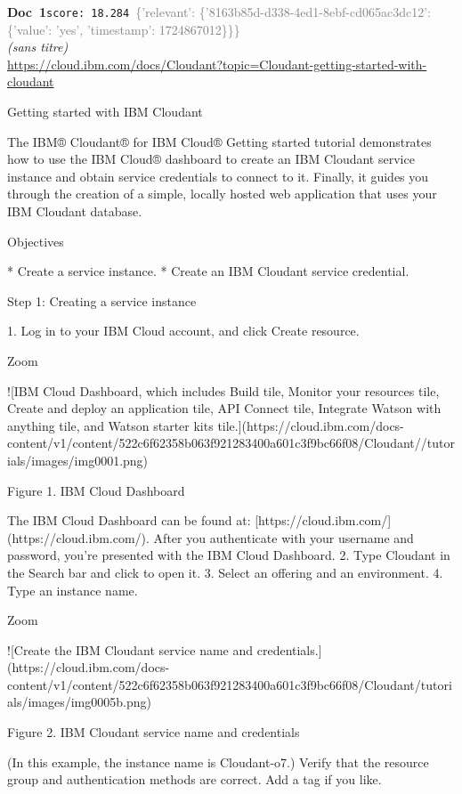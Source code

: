 \documentclass[a4paper,11pt]{article}
\begin{document}
\begin{docenv}
{\footnotesize\textcolor{doccolor}{\textbf{Doc~1}}}\hfill{\tiny\texttt{score:~18.284}}\ {\tiny\textcolor{gray}{\{'relevant': \{'8163b85d-d338-4ed1-8ebf-cd065ac3dc12': \{'value': 'yes', 'timestamp': 1724867012\}\}\}}}\\[3pt]
{\small\textit{(sans titre)}}\\[2pt]
{\tiny\url{https://cloud.ibm.com/docs/Cloudant?topic=Cloudant-getting-started-with-cloudant}}\\[4pt]
{\footnotesize 
Getting started with IBM Cloudant 

The IBM® Cloudant® for IBM Cloud® Getting started tutorial demonstrates how to use the IBM Cloud® dashboard to create an IBM Cloudant service instance and obtain service credentials to connect to it. Finally, it guides you through the creation of a simple, locally hosted web application that uses your IBM Cloudant database.



 Objectives 



* Create a service instance.
* Create an IBM Cloudant service credential.







 Step 1: Creating a service instance 



1. Log in to your IBM Cloud account, and click Create resource.

Zoom

![IBM Cloud Dashboard, which includes Build tile, Monitor your resources tile, Create and deploy an application tile, API Connect tile, Integrate Watson with anything tile, and Watson starter kits tile.](https://cloud.ibm.com/docs-content/v1/content/522c6f62358b063f921283400a601c3f9bc66f08/Cloudant//tutorials/images/img0001.png)

Figure 1. IBM Cloud Dashboard

The IBM Cloud Dashboard can be found at: [https://cloud.ibm.com/](https://cloud.ibm.com/). After you authenticate with your username and password, you're presented with the IBM Cloud Dashboard.
2. Type Cloudant in the Search bar and click to open it.
3. Select an offering and an environment.
4. Type an instance name.

Zoom

![Create the IBM Cloudant service name and credentials.](https://cloud.ibm.com/docs-content/v1/content/522c6f62358b063f921283400a601c3f9bc66f08/Cloudant/tutorials/images/img0005b.png)

Figure 2. IBM Cloudant service name and credentials

(In this example, the instance name is Cloudant-o7.) Verify that the resource group and authentication methods are correct. Add a tag if you like.}
\end{docenv}
\end{document}
